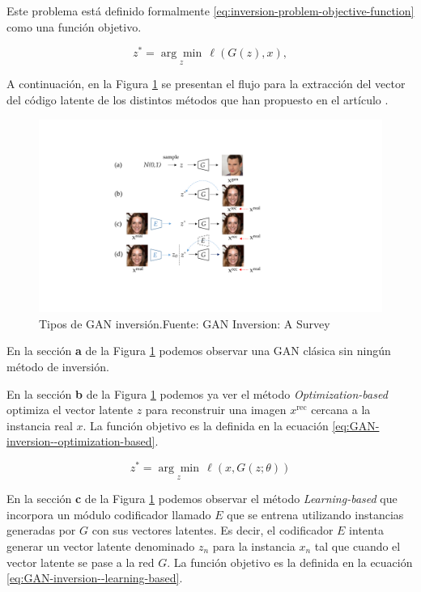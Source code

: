 Este problema está definido formalmente \ref{eq:inversion-problem-objective-function} como una función objetivo.

\begin{equation}
    z^{*} = \underset{z}{\arg\min}\, \ell\left( G(z), x \right),
    \label{eq:inversion-problem-objective-function}
\end{equation}

A continuación, en la Figura \ref{fig:gan-inversion-methods} se presentan el flujo para la extracción del vector del código latente de los distintos métodos que han propuesto en el artículo \cite{GANInversionSurvey-xia2022gan}.

\begin{figure}[H]
    \centering
    \includegraphics[width=0.5\linewidth]{figures/chapter02/inversion_types.pdf}
    \caption{Tipos de GAN inversión.\newline{}Fuente: GAN Inversion: A Survey \cite{GANInversionSurvey-xia2022gan}}
    \label{fig:gan-inversion-methods}
\end{figure}

En la sección \textbf{a} de la Figura \ref{fig:gan-inversion-methods} podemos observar una \gls{GAN} clásica sin ningún método de inversión.

En la sección \textbf{b} de la Figura \ref{fig:gan-inversion-methods} podemos ya ver el método \textit{Optimization-based} optimiza el vector latente ${z}$ para reconstruir una imagen ${x^{\text{rec}}}$ cercana a la instancia real ${x}$. La función objetivo es la definida en la ecuación \ref{eq:GAN-inversion--optimization-based}.

\begin{equation}
    z^{*} = \underset{z}{\arg\min}\, \ell(x, G(z; \theta))
    \label{eq:GAN-inversion--optimization-based}
\end{equation}

En la sección \textbf{c} de la Figura \ref{fig:gan-inversion-methods} podemos observar el método \textit{Learning-based} que incorpora un módulo codificador llamado ${E}$ que se entrena utilizando instancias generadas por ${G}$ con sus vectores latentes. Es decir, el codificador ${E}$ intenta generar un vector latente denominado ${z_{n}}$ para la instancia ${x_{n}}$ tal que cuando el vector latente se pase a la red ${G}$. La función objetivo es la definida en la ecuación \ref{eq:GAN-inversion--learning-based}.

